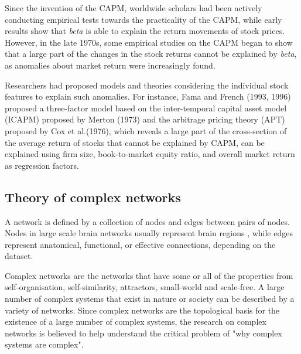 Since the invention of the CAPM, worldwide scholars had been actively conducting empirical tests towards the practicality of the CAPM, while early results show that \textit{beta} is able to explain the return movements of stock prices. However, in the late 1970s, some empirical studies on the CAPM began to show that a large part of the changes in the stock returns cannot be explained by \textit{beta}, as anomalies about market return were increasingly found.

Researchers had proposed models and theories considering the individual stock features to explain such anomalies. For instance, Fama and French (1993, 1996) proposed a three-factor model based on the inter-temporal capital asset model (ICAPM) \cite{intertemporal} proposed by Merton (1973) and the arbitrage pricing theory (APT)~\cite{options} proposed by Cox et al.(1976), which reveals a large part of the cross-section of the average return of stocks that cannot be explained by CAPM, can be explained using firm size, book-to-market equity ratio, and overall market return~\cite{riskfactors, anomalies} as regression factors.


\subsection{Theory of complex networks}
A network is defined by a collection of nodes and edges between pairs of nodes. Nodes in large scale brain networks usually represent brain regions \cite{rubinov2010complex}, while edges represent anatomical, functional, or effective connections, depending on the dataset.

Complex networks are the networks that have some or all of the properties from self-organisation, self-similarity, attractors, small-world and scale-free. A large number of complex systems that exist in nature or society can be described by a variety of networks. Since complex networks are the topological basis for the existence of a large number of complex systems, the research on complex networks is believed to help understand the critical problem of "why complex systems are complex".

